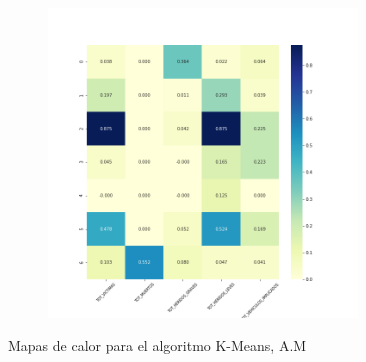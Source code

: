 \begin{figure}[H]
\begin{subfigure}{.5\textwidth}
\end{subfigure}
\begin{subfigure}{.5\textwidth}
  \centering
  \includegraphics[width=0.9\textwidth]{imagenes/case2/kmeans/heatmaps/hm_kmeans_case2_salida_k7.png}
\end{subfigure}
\caption{Mapas de calor para el algoritmo K-Means, A.M}
\label{fig:hm-km}
\end{figure}


